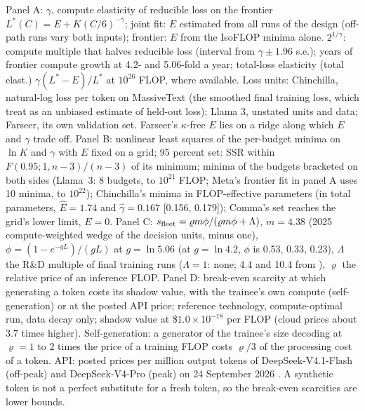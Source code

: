 \begin{table}[tp]
\begin{tablenotes}[Notes]
Panel A: $\gamma$, compute elasticity of reducible loss on the frontier $L^*(C)=E+K(C/6)^{-\gamma}$; joint fit: $E$ estimated from all runs of the design (off-path runs vary both inputs); frontier: $E$ from the IsoFLOP minima alone. $2^{1/\gamma}$: compute multiple that halves reducible loss (interval from $\gamma\pm1.96$ s.e.); years of frontier compute growth at 4.2- and 5.06-fold a year; total-loss elasticity (total elast.) $\gamma(L^*-E)/L^*$ at $10^{26}$ FLOP, where available. Loss units: Chinchilla, natural-log loss per token on MassiveText (the smoothed final training loss, which \citet{hoffmann2022training} treat as an unbiased estimate of held-out loss); Llama 3, unstated units and data; Farseer, its own validation set. Farseer's $\kappa$-free $E$ lies on a ridge along which $E$ and $\gamma$ trade off. Panel B: nonlinear least squares of the per-budget minima on $\ln K$ and $\gamma$ with $E$ fixed on a grid; 95 percent set: SSR within $F(0.95;1,n-3)/(n-3)$ of its minimum; minima of the budgets bracketed on both sides (Llama~3: 8 budgets, to $10^{21}$ FLOP; Meta's frontier fit in panel A uses 10 minima, to $10^{22}$); Chinchilla's minima in FLOP-effective parameters (in total parameters, $\hat E=1.74$ and $\hat\gamma=0.167$ [0.156, 0.179]); Comma's set reaches the grid's lower limit, $E=0$. Panel C: $s_{\rm fleet}=\varrho m\phi/(\varrho m\phi+\Lambda)$, $m=4.38$ (2025 compute-weighted wedge of the decision units, minus one), $\phi=(1-e^{-gL})/(gL)$ at $g=\ln5.06$ (at $g=\ln4.2$, $\phi$ is 0.53, 0.33, 0.23), $\Lambda$ the R\&D multiple of final training runs ($\Lambda=1$: none; 4.4 and 10.4 from \citealp{denain2026final}), $\varrho$ the relative price of an inference FLOP. Panel D: break-even scarcity at which generating a token costs its shadow value, with the trainee's own compute (self-generation) or at the posted API price; reference technology, compute-optimal run, data decay only; shadow value at \$$1.0\times10^{-18}$ per FLOP (cloud prices about 3.7 times higher). Self-generation: a generator of the trainee's size decoding at $\varrho=1$ to 2 times the price of a training FLOP costs $\varrho/3$ of the processing cost of a token. API: posted prices per million output tokens of DeepSeek-V4.1-Flash (off-peak) and DeepSeek-V4-Pro (peak) on 24 September 2026 \citep{deepseek2026pricing}. A synthetic token is not a perfect substitute for a fresh token, so the break-even scarcities are lower bounds.
\end{tablenotes}
\end{table}
